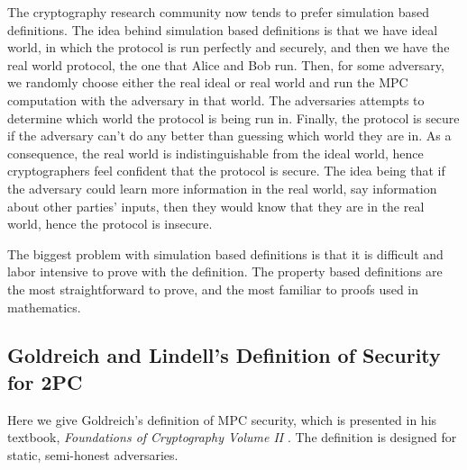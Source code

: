 \documentclass[12pt,twoside]{reedthesis}
\begin{document}
The cryptography research community now tends to prefer simulation based definitions. 
The idea behind simulation based definitions is that we have ideal world, in which the protocol is run perfectly and securely, and then we have the real world protocol, the one that Alice and Bob run. 
Then, for some adversary, we randomly choose either the real ideal or real world and run the MPC computation with the adversary in that world.
The adversaries attempts to determine which world the protocol is being run in.
Finally, the protocol is secure if the adversary can't do any better than guessing which world they are in.
As a consequence, the real world is indistinguishable from the ideal world, hence cryptographers feel confident that the protocol is secure. 
The idea being that if the adversary could learn more information in the real world, say information about other parties' inputs, then they would know that they are in the real world, hence the protocol is insecure. 

The biggest problem with simulation based definitions is that it is difficult and labor intensive to prove with the definition.
The property based definitions are the most straightforward to prove, and the most familiar to proofs used in mathematics.


\subsection{Goldreich and Lindell's Definition of Security for 2PC}
Here we give Goldreich's definition of MPC security, which is presented in his textbook, \textit{Foundations of Cryptography Volume II} \cite{goldreich_vol2}. 
The definition is designed for static, semi-honest adversaries. 
\end{document}
